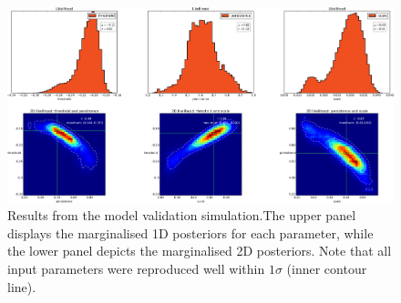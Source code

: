 \documentclass[aps,pre,twocolumn,letterpaper,floatfix,showpacs]{revtex4}
\begin{document}
\begin{figure}
\includegraphics[width=.99\textwidth]{fig6.png}
\caption{Results from the model validation simulation.The upper panel displays the marginalised 1D posteriors for each parameter, while the lower panel depicts the marginalised 2D posteriors. Note that all input parameters were reproduced well within $1 \sigma$ (inner contour line).}
\label{fig:mockdataresults_pts}
\end{figure}
\end{document}
